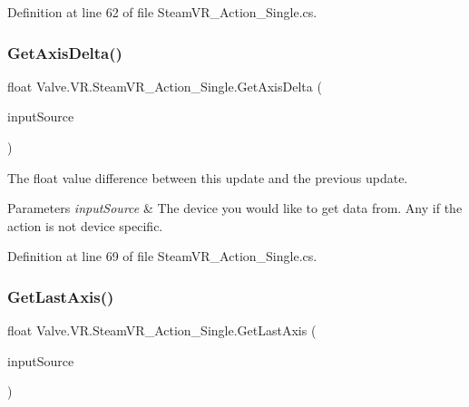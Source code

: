 Definition at line 62 of file Steam\+V\+R\+\_\+\+Action\+\_\+\+Single.\+cs.

\mbox{\label{class_valve_1_1_v_r_1_1_steam_v_r___action___single_a8aa6e18ddcc56f8eb53277dbf91a731a}} 
\subsubsection{\texorpdfstring{GetAxisDelta()}{GetAxisDelta()}}
{\footnotesize\ttfamily float Valve.\+V\+R.\+Steam\+V\+R\+\_\+\+Action\+\_\+\+Single.\+Get\+Axis\+Delta (\begin{DoxyParamCaption}\item[{\mbox{\hyperlink{namespace_valve_1_1_v_r_a82e5bf501cc3aa155444ee3f0662853f}{Steam\+V\+R\+\_\+\+Input\+\_\+\+Sources}}}]{input\+Source }\end{DoxyParamCaption})}



The float value difference between this update and the previous update. 


\begin{DoxyParams}{Parameters}
{\em input\+Source} & The device you would like to get data from. Any if the action is not device specific.\\
\hline
\end{DoxyParams}


Definition at line 69 of file Steam\+V\+R\+\_\+\+Action\+\_\+\+Single.\+cs.

\mbox{\label{class_valve_1_1_v_r_1_1_steam_v_r___action___single_a6c9ab66919b07bc3bdf1012b9c1a05c1}} 
\subsubsection{\texorpdfstring{GetLastAxis()}{GetLastAxis()}}
{\footnotesize\ttfamily float Valve.\+V\+R.\+Steam\+V\+R\+\_\+\+Action\+\_\+\+Single.\+Get\+Last\+Axis (\begin{DoxyParamCaption}\item[{\mbox{\hyperlink{namespace_valve_1_1_v_r_a82e5bf501cc3aa155444ee3f0662853f}{Steam\+V\+R\+\_\+\+Input\+\_\+\+Sources}}}]{input\+Source }\end{DoxyParamCaption})}



